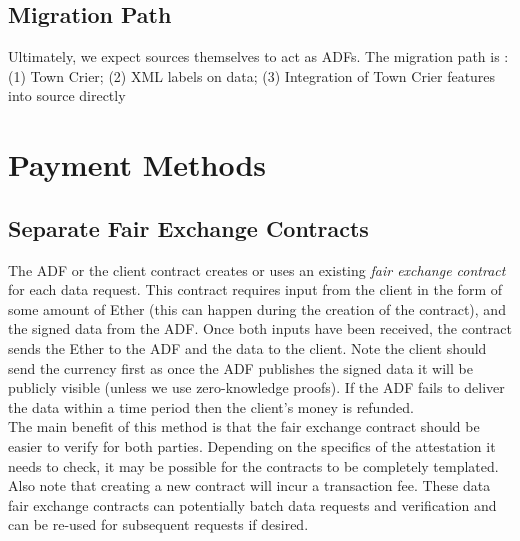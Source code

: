 \subsection{Migration Path}

Ultimately, we expect sources themselves to act as ADFs. The migration path is : (1) Town Crier; (2) XML labels on data; (3) Integration of Town Crier features into source directly

\section{Payment Methods}	
\subsection{Separate Fair Exchange Contracts}
    The ADF or the client contract creates or uses an existing \emph{fair exchange contract} for each data request.  This contract requires input from the client in the form of some amount of Ether (this can happen during the creation of the contract), and the signed data from the ADF.  Once both inputs have been received, the contract sends the Ether to the ADF and the data to the client. Note the client should send the currency first as once the ADF publishes the signed data it will be publicly visible (unless we use zero-knowledge proofs). If the ADF fails to deliver the data within a time period then the client's money is refunded.\\
    \indent The main benefit of this method is that the fair exchange contract should be easier to verify for both parties.  Depending on the specifics of the attestation it needs to check, it may be possible for the contracts to be completely templated.  Also note that creating a new contract will incur a transaction fee.  These data fair exchange contracts can potentially batch data requests and verification and can be re-used for subsequent requests if desired. \\
    

